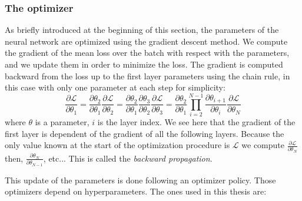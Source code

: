 \documentclass[../main.tex]{subfiles}
\begin{document}
\subsubsection{The optimizer}
\label{sec:ml:optim}

As briefly introduced at the beginning of this section, the parameters of the neural network are optimized using the gradient descent method. We compute the gradient of the mean loss over the batch with respect with the parameters, and we update them in order to minimize the loss. The  gradient is computed backward from the loss up to the first layer parameters using the chain rule, in this case with only one parameter at each step for simplicity:
\begin{equation}
  \label{eq:ml:backward}
  \frac{\partial \mathcal{L}}{\partial \theta_1} = \frac{\partial \theta_2}{\partial \theta_1} \frac{\partial \mathcal{L}}{\partial \theta_2} = \frac{\partial \theta_2}{\partial \theta_1} \frac{\partial \theta_3}{\partial \theta_2} \frac{\partial \mathcal{L}}{\partial \theta_3} = \frac{\partial \theta_2}{\partial \theta_1} \prod_{i=2}^{N-1} \frac{\partial \theta_{i+1}}{\partial \theta_i} \frac{\partial \mathcal{L}}{\partial \theta_N}
\end{equation}
where $\theta$ is a parameter, $i$ is the layer index. We see here that the gradient of the first layer is dependent of the gradient of all the following layers. Because the only value known at the start of the optimization procedure is $\mathcal{L}$ we compute $\frac{\partial \mathcal{L}}{\partial \theta_N}$ then, $\frac{\partial \theta_{N}}{\partial \theta_{N-1}}$, etc... This is called the \textit{backward propagation}.

This update of the parameters is done following an optimizer policy. Those optimizers depend on hyperparameters. The ones used in this thesis are:
\end{document}
